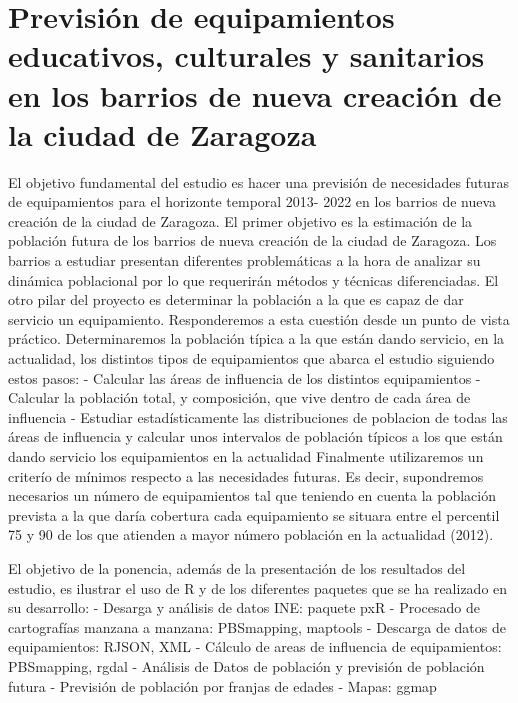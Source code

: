 \chapter{Previsión de equipamientos educativos, culturales y sanitarios en los barrios de nueva creación de la ciudad de Zaragoza}




El objetivo fundamental del estudio es hacer una previsión de necesidades futuras de equipamientos para el horizonte temporal 2013- 2022 en los barrios de nueva creación  de la ciudad de Zaragoza. 
El primer objetivo es la estimación  de la población futura de los barrios de nueva creación de la ciudad de Zaragoza. Los barrios a estudiar presentan diferentes problemáticas a la hora de analizar su dinámica poblacional por lo que requerirán métodos y técnicas diferenciadas.
El otro pilar del proyecto es determinar la población a la que es capaz de dar servicio un equipamiento. Responderemos a esta cuestión desde un punto de vista práctico. Determinaremos la población típica a la que están dando servicio, en la actualidad, los distintos tipos de equipamientos que abarca el estudio siguiendo estos pasos:
 - Calcular las áreas de influencia de los distintos equipamientos
 - Calcular la población total, y composición, que vive dentro de cada área de influencia
 - Estudiar estadísticamente las distribuciones de  poblacion de todas las áreas de influencia y calcular unos intervalos de población típicos a los que están dando servicio los equipamientos en la actualidad
Finalmente utilizaremos un  criterío  de mínimos respecto a las necesidades futuras. Es decir, supondremos necesarios un número de equipamientos tal que teniendo en cuenta la población prevista a la que daría cobertura cada equipamiento se situara entre el percentil 75 y 90 de los que atienden a mayor número población en la actualidad (2012).

El objetivo de la ponencia, además de  la presentación de los resultados del estudio, es ilustrar el uso de R y de los diferentes paquetes que se ha realizado en su desarrollo:
- Desarga y análisis de datos INE: paquete pxR
- Procesado de cartografías manzana a manzana: PBSmapping, maptools
- Descarga de datos de equipamientos: RJSON, XML
- Cálculo de areas de influencia de equipamientos: PBSmapping, rgdal
- Análisis de Datos de población y previsión de población futura 
- Previsión de población por franjas de edades 
- Mapas: ggmap

%

%
